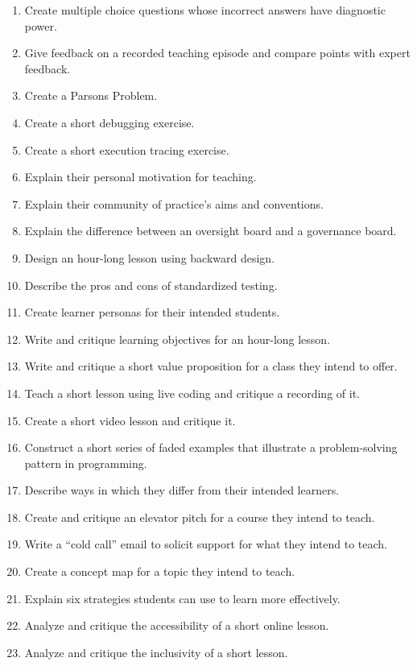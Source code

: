 \begin{enumerate}
\item
  Create multiple choice questions whose incorrect answers have
  diagnostic power.
\item
  Give feedback on a recorded teaching episode and compare points with
  expert feedback.
\item
  Create a Parsons Problem.
\item
  Create a short debugging exercise.
\item
  Create a short execution tracing exercise.
\item
  Explain their personal motivation for teaching.
\item
  Explain their community of practice's aims and conventions.
\item
  Explain the difference between an oversight board and a governance
  board.
\item
  Design an hour-long lesson using backward design.
\item
  Describe the pros and cons of standardized testing.
\item
  Create learner personas for their intended students.
\item
  Write and critique learning objectives for an hour-long lesson.
\item
  Write and critique a short value proposition for a class they
  intend to offer.
\item
  Teach a short lesson using live coding and critique a recording of
  it.
\item
  Create a short video lesson and critique it.
\item
  Construct a short series of faded examples that illustrate a
  problem-solving pattern in programming.
\item
  Describe ways in which they differ from their intended learners.
\item
  Create and critique an elevator pitch for a course they intend to
  teach.
\item
  Write a ``cold call'' email to solicit support for what they intend
  to teach.
\item
  Create a concept map for a topic they intend to teach.
\item
  Explain six strategies students can use to learn more effectively.
\item
  Analyze and critique the accessibility of a short online lesson.
\item
  Analyze and critique the inclusivity of a short lesson.

\end{enumerate}
